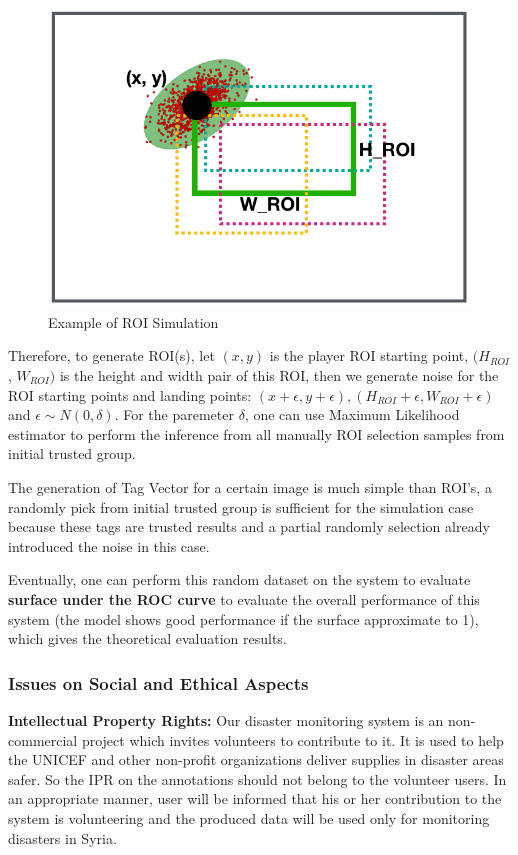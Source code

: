 \begin{figure}[htp]
\centering
\includegraphics[width=0.5\columnwidth]{figures/evaluation}
\caption{Example of ROI Simulation}
\label{fig:evaluation}
\end{figure}

Therefore, to generate ROI(s), let $(x, y)$ is the player ROI starting point, $(H_{ROI}$, $W_{ROI})$ is the height
and width pair of this ROI, then we generate noise for the ROI starting points and landing points: 
$(x+\epsilon, y+\epsilon), (H_{ROI}+\epsilon, W_{ROI}+\epsilon)$ and $\epsilon \sim N(0, \delta)$.
For the paremeter $\delta$, one can use Maximum Likelihood estimator \cite{johansen1990maximum} 
to perform the inference from all manually ROI selection samples from initial trusted group.

The generation of Tag Vector for a certain image is much simple than ROI's, 
a randomly pick from initial trusted group is sufficient for the simulation case 
because these tags are trusted results and a partial randomly selection already introduced the noise in this case.

Eventually, one can perform this random dataset on the system to evaluate \textbf{surface under the ROC curve} to
evaluate the overall performance of this system (the model shows good performance if the surface approximate to 1), 
which gives the theoretical evaluation results.

\subsubsection{Issues on Social and Ethical Aspects}
\label{chapter:ethical}

\textbf{Intellectual Property Rights:} 
Our disaster monitoring system is an non-commercial project which invites volunteers to contribute to it. 
It is used to help the UNICEF and other non-profit organizations deliver supplies in disaster areas safer. 
So the IPR on the annotations should not belong to the volunteer users. In an appropriate manner, user will be informed that 
his or her contribution to the system is volunteering and the produced data will be used only for 
monitoring disasters in Syria.

